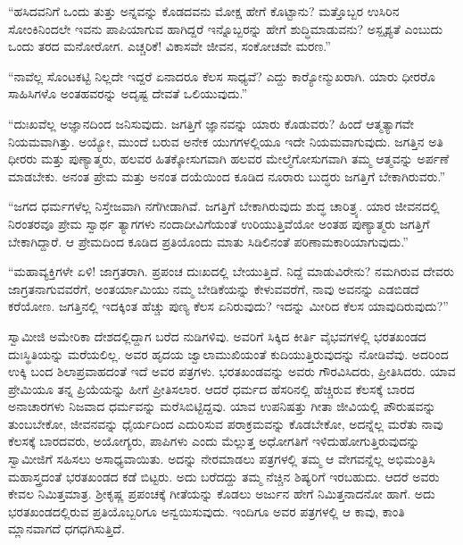  “ಹಸಿದವನಿಗೆ ಒಂದು ತುತ್ತು ಅನ್ನವನ್ನು ಕೊಡದವನು ಮೋಕ್ಷ ಹೇಗೆ ಕೊಟ್ಟಾನು? ಮತ್ತೊಬ್ಬರ ಉಸಿರಿನ ಸೋಂಕಿನಿಂದಲೇ ಇವನು ಪಾಪಿಯಾಗುವ ಹಾಗಿದ್ದರೆ ಇನ್ನೊಬ್ಬರನ್ನು ಹೇಗೆ ಶುದ್ಧಿಮಾಡುವನು? ಅಸ್ಪೃಶ್ಯತೆ ಎಂಬುದು ಒಂದು ತರದ ಮನೋರೋಗ. ಎಚ್ಚರಿಕೆ! ವಿಕಾಸವೇ ಜೀವನ, ಸಂಕೋಚವೇ ಮರಣ.” 

 “ನಾವೆಲ್ಲ ಸೊಂಟಕಟ್ಟಿ ನಿಲ್ಲದೇ ಇದ್ದರೆ ಏನಾದರೂ ಕೆಲಸ ಸಾಧ್ಯವೆ? ಎದ್ದು ಕಾರ‍್ಯೋನ್ಮುಖರಾಗಿ. ಯಾರು ಧೀರರೊ ಸಾಹಿಸಿಗಳೊ ಅಂತಹವರನ್ನು ಅದೃಷ್ಟ ದೇವತೆ ಒಲಿಯುವುದು.” 

 “ದುಃಖವೆಲ್ಲ ಅಜ್ಞಾನದಿಂದ ಜನಿಸುವುದು. ಜಗತ್ತಿಗೆ ಜ್ಞಾನವನ್ನು ಯಾರು ಕೊಡುವರು? ಹಿಂದೆ ಆತ್ಮತ್ಯಾಗವೇ ನಿಯಮವಾಗಿತ್ತು. ಅಯ್ಯೋ, ಮುಂದೆ ಬರುವ ಅನೇಕ ಯುಗಗಳಲ್ಲಿಯೂ ಇದೇ ನಿಯಮವಾಗುವುದು. ಜಗತ್ತಿನ ಅತಿ ಧೀರರು ಮತ್ತು ಪುಣ್ಯಾತ್ಮರು, ಹಲವರ ಹಿತಕ್ಕೋಸುಗವಾಗಿ ಹಲವರ ಮೇಲ್ಮೆಗೋಸುಗವಾಗಿ ತಮ್ಮ ಆತ್ಮವನ್ನು ಅರ್ಪಣೆ ಮಾಡಬೇಕು. ಅನಂತ ಪ್ರೇಮ ಮತ್ತು ಅನಂತ ದಯೆಯಿಂದ ಕೂಡಿದ ನೂರಾರು ಬುದ್ಧರು ಜಗತ್ತಿಗೆ ಬೇಕಾಗಿರುವರು.” 

 “ಜಗದ ಧರ್ಮಗಳೆಲ್ಲ ನಿಸ್ತೇಜವಾಗಿ ನಗೆಗೀಡಾಗಿವೆ. ಜಗತ್ತಿಗೆ ಬೇಕಾಗಿರುವುದು ಶುದ್ಧ ಚಾರಿತ್ರ್ಯ. ಯಾರ ಜೀವನದಲ್ಲಿ ನಿರಂತರವೂ ಪ್ರೇಮ ಸ್ವಾರ್ಥ ತ್ಯಾಗಗಳು ನಂದಾದೀವಿಗೆಯಂತೆ ಉರಿಯುತ್ತಿವೆಯೋ ಅಂತಹ ಪುಣ್ಯಾತ್ಮರು ಜಗತ್ತಿಗೆ ಬೇಕಾಗಿದ್ದಾರೆ. ಆ ಪ್ರೇಮದಿಂದ ಕೂಡಿದ ಪ್ರತಿಯೊಂದು ಮಾತು ಸಿಡಿಲಿನಂತೆ ಪರಿಣಾಮಕಾರಿಯಾಗುವುದು.” 

 “ಮಹಾವ್ಯಕ್ತಿಗಳೇ ಏಳಿ! ಜಾಗ್ರತರಾಗಿ. ಪ್ರಪಂಚ ದುಃಖದಲ್ಲಿ ಬೇಯುತ್ತಿದೆ. ನಿದ್ದೆ ಮಾಡುವಿರೇನು? ನಮಗಿರುವ ದೇವರು ಜಾಗ್ರತನಾಗುವವರೆಗೆ, ಅಂತರ್ಯಾಮಿಯು ನಮ್ಮ ಬೇಡಿಕೆಯನ್ನು ಕೇಳುವವರೆಗೆ, ನಾವು ಅವನನ್ನು ಎಡಬಿಡದೆ ಕರೆಯೋಣ. ಜಗತ್ತಿನಲ್ಲಿ ಇದಕ್ಕಿಂತ ಹೆಚ್ಚು ಪುಣ್ಯ ಕೆಲಸ ಏನಿರುವುದು? ಇದನ್ನು ಮೀರಿದ ಕೆಲಸ ಯಾವುದಿರುವುದು?” 

 ಸ್ವಾಮೀಜಿ ಅಮೇರಿಕಾ ದೇಶದಲ್ಲಿದ್ದಾಗ ಬರೆದ ನುಡಿಗಳಿವು. ಅವರಿಗೆ ಸಿಕ್ಕಿದ ಕೀರ್ತಿ ವೈಭವಗಳಲ್ಲಿ ಭರತಖಂಡದ ದುಃಸ್ಥಿತಿಯನ್ನು ಮರೆಯಲಿಲ್ಲ. ಅವರ ಹೃದಯ ಜ್ವಾಲಾಮುಖಿಯಂತೆ ಕುದಿಯುತ್ತಿರುವುದನ್ನು ನೋಡಿವೆವು. ಅದರಿಂದ ಉಕ್ಕಿ ಬಂದ ಶಿಲಾಪ್ರವಾಹದಂತೆ ಇದೆ ಅವರ ಪತ್ರಗಳು. ಭರತಖಂಡವನ್ನು ಅವರು ಗೌರವಿಸಿದರು, ಪ್ರೀತಿಸಿದರು. ಯಾವ ಪ್ರೇಮಿಯೂ ತನ್ನ ಪ್ರಿಯೆಯನ್ನು ಹೀಗೆ ಪ್ರೀತಿಸಲಾರ. ಆದರೆ ಧರ್ಮದ ಹೆಸರಿನಲ್ಲಿ ಹೆಚ್ಚಿರುವ ಕೆಲಸಕ್ಕೆ ಬಾರದ ಅನಾಚಾರಗಳು ನಿಜವಾದ ಧರ್ಮವನ್ನು ಮರೆಸಿಬಿಟ್ಟಿದ್ದವು. ಯಾವ ಉಪನಿಷತ್ತು ಗೀತಾ ಜೀವಿಯಲ್ಲಿ ಪೌರುಷವನ್ನು ತುಂಬಬೇಕೋ, ಜೀವನವನ್ನು ಧೈರ್ಯದಿಂದ ಎದುರಿಸುವ ಪರಾಕ್ರಮವನ್ನು ಕೊಡಬೇಕೋ, ಅದನ್ನೆಲ್ಲ ಮರೆತು ನಾವು ಕೆಲಸಕ್ಕೆ ಬಾರದವರು, ಅಯೋಗ್ಯರು, ಪಾಪಿಗಳು ಎಂದು ಮೆಲ್ಲುತ್ತ ಅಧೋಗತಿಗೆ ಇಳಿದುಹೋಗುತ್ತಿರುವುದನ್ನು ಸ್ವಾಮೀಜಿಗೆ ಸಹಿಸಲು ಅಸಾಧ್ಯವಾಯಿತು. ಅದನ್ನು ನೇರಮಾಡಲು ಪತ್ರಗಳಲ್ಲಿ ತಮ್ಮ ಆ ವೇಗವನ್ನೆಲ್ಲ ಅಭಿಮಂತ್ರಿಸಿ ಮಹಾಸ್ತ್ರದಂತೆ ಭರತಖಂಡದ ಕಡೆ ಬಿಟ್ಟರು. ಅದು ಬರೆದದ್ದು ತಮ್ಮ ನೆಚ್ಚಿನ ಶಿಷ್ಯರಿಗೆ ಇರಬಹುದು. ಆದರೆ ಅವರು ಕೇವಲ ನಿಮಿತ್ತಮಾತ್ರ. ಶ‍್ರೀಕೃಷ್ಣ ಪ್ರಪಂಚಕ್ಕೆ ಗೀತೆಯನ್ನು ಕೊಡಲು ಅರ್ಜುನ ಹೇಗೆ ನಿಮಿತ್ತನಾದನೋ ಹಾಗೆ. ಅದು ಭರತಖಂಡದಲ್ಲಿರುವ ಪ್ರತಿಯೊಬ್ಬರಿಗೂ ಅನ್ವಯಿಸುವುದು. ಇಂದಿಗೂ ಅವರ ಪತ್ರಗಳಲ್ಲಿ ಆ ಕಾವು, ಕಾಂತಿ ಮ್ಲಾನವಾಗದೆ ಧಗಧಗಿಸುತ್ತಿದೆ. 


